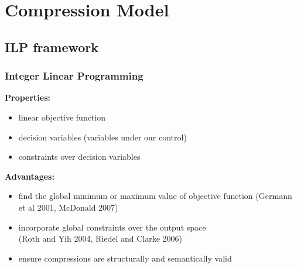 \documentclass{beamer}
\begin{document}

\section{Compression Model}

\subsection{ILP framework}

\begin{frame}
  \frametitle{Integer Linear Programming}
\textbf{Properties:}
  \begin{itemize}
  \item linear objective function
  \item decision variables (variables under our control)
  \item constraints over decision variables
  \end{itemize}

\vspace{.5ex}
\textbf{Advantages:}
  \begin{itemize}
  \item find the \alert{global} minimum or maximum value of 
    \alert{objective function} (Germann et al 2001, McDonald 2007)
  \item incorporate global \alert{constraints} over the output space\\ (Roth and
    Yih 2004, Riedel and Clarke 2006)
  \item ensure compressions are \alert{structurally} and
    \alert{semantically} valid
  \end{itemize}
\end{frame}

\end{document}
